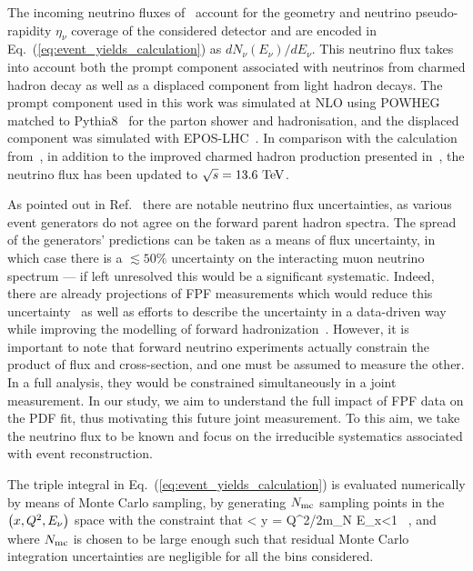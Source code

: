 The incoming neutrino fluxes of~\cite{Kling:2021gos} account for the geometry
and neutrino pseudo-rapidity $\eta_\nu$ coverage of the considered detector and
are encoded in Eq.~(\ref{eq:event_yields_calculation}) as $dN_{\nu}(E_\nu)/dE_{\nu}$.
%
This neutrino flux takes into account both the prompt component associated with neutrinos from charmed hadron decay as well as a displaced component from light hadron decays.
%
The prompt component used in this work was simulated at NLO using {\sc\small POWHEG}~\cite{Nason:2004rx,Frixione:2007vw,Alioli:2010xd} matched to {\sc\small Pythia8}~\cite{Sjostrand:2014zea, Bierlich:2022pfr} for the parton shower and hadronisation, and the displaced component was simulated with {\sc\small EPOS-LHC}~\cite{Pierog:2013ria}.
%
In comparison with the calculation from~\cite{Kling:2021gos}, in addition to the improved charmed hadron production presented in~\cite{Sominka:2023},
the neutrino flux has been updated to $\sqrt{s} = 13.6~{\rm TeV}$.


%
As pointed out in Ref.~\cite{Kling:2021gos} there are notable neutrino flux uncertainties, as various event generators do not agree on the forward parent hadron spectra. 
%
The spread of the generators' predictions can be taken as a means of flux uncertainty, in which case there is a $\lesssim 50\%$ uncertainty on the interacting muon neutrino spectrum --- if left unresolved this would be a significant systematic. Indeed, there are already projections of FPF measurements which would reduce this uncertainty~\cite{Kling:2023tgr} as well as efforts to describe the uncertainty in a data-driven way while improving the modelling of forward hadronization~\cite{Fieg:2023kld}.
%
However, it is important to note that forward neutrino experiments actually constrain the product of flux and cross-section, and one must be assumed to measure the other. In a full analysis,  they would be constrained simultaneously in a joint measurement.
%
In our study, we aim to understand the full impact of FPF data on the PDF fit, thus motivating this future joint measurement.
%
To this aim, we take the neutrino flux to be known and focus on the irreducible systematics associated with event reconstruction. 


The triple integral in  Eq.~(\ref{eq:event_yields_calculation}) is evaluated numerically by means
of Monte Carlo sampling, by generating  $N_{\rm mc}$
sampling points in the $\left( x,Q^2,E_{\nu}\right)$ space
with the constraint that
 < y \lp = Q^2/2m_N E_{\nu }x\rp <1 \, ,
\ee
and where $N_{\rm mc}$ is chosen to be large enough such that residual Monte Carlo integration
uncertainties are negligible for all the bins considered.

